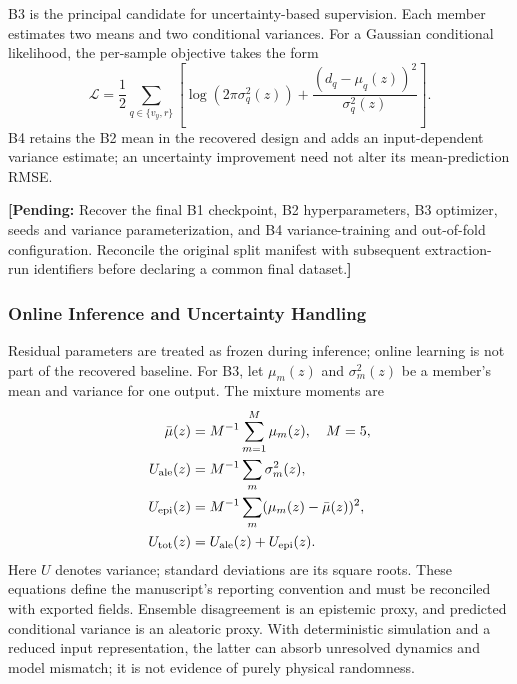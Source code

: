 \documentclass[10pt,journal]{IEEEtran}
\newcommand{\pending}[1]{\par\smallskip\noindent\textbf{[Pending:} #1\textbf{]}\par\smallskip}
\begin{document}
B3 is the principal candidate for uncertainty-based supervision. Each member estimates two means and two conditional variances. For a Gaussian conditional likelihood, the per-sample objective takes the form
\begin{equation}
 \mathcal L=\frac12\sum_{q\in\{v_y,r\}}
 \left[\log(2\pi\sigma_q^2(z))+
 \frac{(d_q-\mu_q(z))^2}{\sigma_q^2(z)}\right].\label{eq:nlltrain}
\end{equation}
B4 retains the B2 mean in the recovered design and adds an input-dependent variance estimate; an uncertainty improvement need not alter its mean-prediction RMSE.
\pending{Recover the final B1 checkpoint, B2 hyperparameters, B3 optimizer, seeds and variance parameterization, and B4 variance-training and out-of-fold configuration. Reconcile the original split manifest with subsequent extraction-run identifiers before declaring a common final dataset.}

\subsubsection{Online Inference and Uncertainty Handling}
Residual parameters are treated as frozen during inference; online learning is not part of the recovered baseline. For B3, let $\mu_m(z)$ and $\sigma_m^2(z)$ be a member's mean and variance for one output. The mixture moments are
\begin{align}
 \bar\mu(z)&=M^{-1}\sum_{m=1}^{M}\mu_m(z),\quad M=5,\\
 U_{\rm ale}(z)&=M^{-1}\sum_m\sigma_m^2(z),\\
 U_{\rm epi}(z)&=M^{-1}\sum_m(\mu_m(z)-\bar\mu(z))^2,\\
 U_{\rm tot}(z)&=U_{\rm ale}(z)+U_{\rm epi}(z).\label{eq:uq}
\end{align}
Here $U$ denotes variance; standard deviations are its square roots. These equations define the manuscript's reporting convention and must be reconciled with exported fields. Ensemble disagreement is an epistemic proxy, and predicted conditional variance is an aleatoric proxy. With deterministic simulation and a reduced input representation, the latter can absorb unresolved dynamics and model mismatch; it is not evidence of purely physical randomness.
\end{document}
